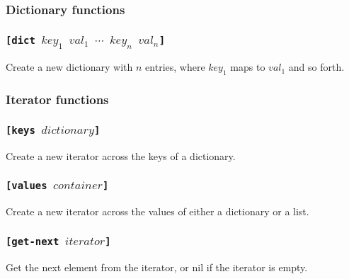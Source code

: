 \documentclass[11pt]{report}
\begin{document}
\subsubsection{Dictionary functions}
\subsubsection*{\tt{[dict }$key_1$  $val_1$ $\cdots$ $key_n$ $val_n$\tt{]}}
Create a new dictionary with $n$ entries, where $key_1$ maps to $val_1$ and so forth.

\subsubsection{Iterator functions}
\subsubsection*{\tt{[keys }$dictionary$\tt{]}}
Create a new iterator across the keys of a dictionary.
\subsubsection*{\tt{[values }$container$\tt{]}}
Create a new iterator across the values of either a dictionary or a list.
\subsubsection*{\tt{[get-next }$iterator$\tt{]}}
Get the next element from the iterator, or nil if the iterator is empty.
\end{document}
